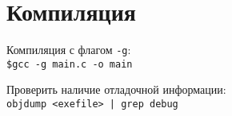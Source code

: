 \section{Компиляция}

\noindent Компиляция с флагом \texttt{-g}: \\
\indent \texttt{\$gcc -g main.c -o main}

\noindent Проверить наличие отладочной информации: \\
\indent \texttt{objdump <exefile> | grep debug}


